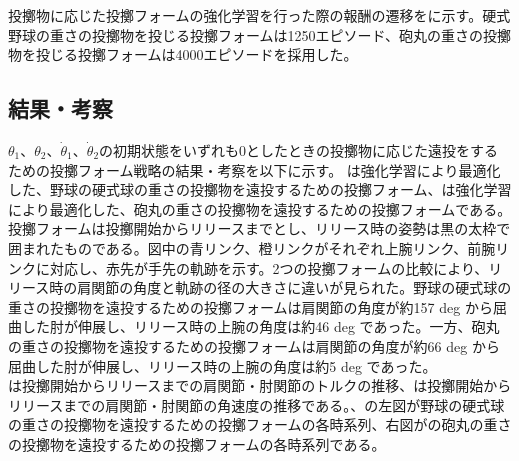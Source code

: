 投擲物に応じた投擲フォームの強化学習を行った際の報酬の遷移をに示す。硬式野球の重さの投擲物を投じる投擲フォームは1250エピソード、砲丸の重さの投擲物を投じる投擲フォームは4000エピソードを採用した。

\subsection{結果・考察}
$\theta_{1}$、$\theta_{2}$、$\dot{\theta}_{1}$、$\dot{\theta}_{2}$の初期状態をいずれも0としたときの投擲物に応じた遠投をするための投擲フォーム戦略の結果・考察を以下に示す。
は強化学習により最適化した、野球の硬式球の重さの投擲物を遠投するための投擲フォーム、は強化学習により最適化した、砲丸の重さの投擲物を遠投するための投擲フォームである。投擲フォームは投擲開始からリリースまでとし、リリース時の姿勢は黒の太枠で囲まれたものである。図中の青リンク、橙リンクがそれぞれ上腕リンク、前腕リンクに対応し、赤先が手先の軌跡を示す。2つの投擲フォームの比較により、リリース時の肩関節の角度と軌跡の径の大きさに違いが見られた。野球の硬式球の重さの投擲物を遠投するための投擲フォームは肩関節の角度が約157 deg から屈曲した肘が伸展し、リリース時の上腕の角度は約46 deg であった。一方、砲丸の重さの投擲物を遠投するための投擲フォームは肩関節の角度が約66 deg から屈曲した肘が伸展し、リリース時の上腕の角度は約5 deg であった。\\
は投擲開始からリリースまでの肩関節・肘関節のトルクの推移、は投擲開始からリリースまでの肩関節・肘関節の角速度の推移である。、の左図が野球の硬式球の重さの投擲物を遠投するための投擲フォームの各時系列、右図がの砲丸の重さの投擲物を遠投するための投擲フォームの各時系列である。\\
